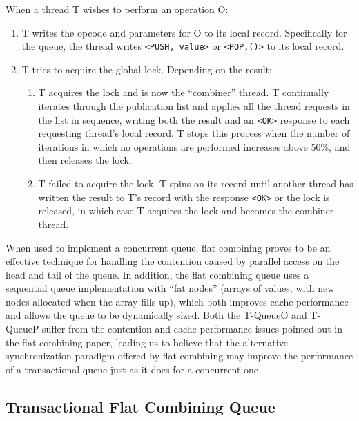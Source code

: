 When a thread T wishes to perform an operation O:
\begin{enumerate}
    \item T writes the opcode and parameters for O to its local record. Specifically for the queue, the thread writes \texttt{<PUSH, value>} or \texttt{<POP,()>} to its local record.
   \item T tries to acquire the global lock. Depending on the result:
   \begin{enumerate}
       \item T acquires the lock and is now the “combiner” thread. T continually iterates through the publication list and applies all the thread requests in the list in sequence, writing both the result and an \texttt{<OK>} response to each requesting thread's local record. T stops this process when the number of iterations in which no operations are performed increases above 50\%, and then releases the lock.
        \item T failed to acquire the lock. T spins on its record until another thread has written the result to T's record with the response \texttt{<OK>} or the lock is released, in which case T acquires the lock and becomes the combiner thread. 
    \end{enumerate}
\end{enumerate}

When used to implement a concurrent queue, flat combining proves to be an effective technique for handling the contention caused by parallel access on the head and tail of the queue. In addition, the flat combining queue uses a sequential queue implementation with ``fat nodes'' (arrays of values, with new nodes allocated when the array fills up), which both improves cache performance and allows the queue to be dynamically sized. Both the T-QueueO and T-QueueP suffer from the contention and cache performance issues pointed out in the flat combining paper, leading us to believe that the alternative synchronization paradigm offered by flat combining may improve the performance of a transactional queue just as it does for a concurrent one.

\subsection{Transactional Flat Combining Queue} 
\label{fcqueuet}

